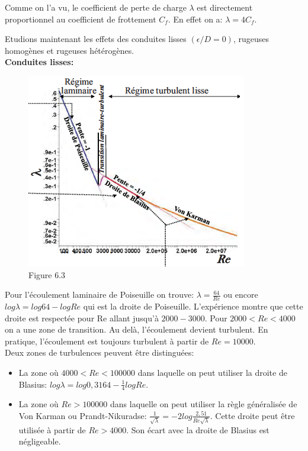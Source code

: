 Comme on l'a vu, le coefficient de perte de charge $\lambda$ est directement proportionnel au coefficient de frottement $C_f$. En effet on a: $\lambda=4C_f$.

Etudions maintenant les effets des conduites lisses $(\epsilon/D=0)$, rugeuses homogènes et rugeuses hétérogènes.
\\

\textbf{Conduites lisses:} \\
\begin{figure}
\vspace{-5mm}
\includegraphics[scale=0.50]{ch6/64.png}
\caption*{Figure 6.3}
\end{figure}
Pour l'écoulement laminaire de Poiseuille on trouve: $\lambda=\frac{64}{Re}$ ou encore $log\lambda=log64-logRe$ qui est la droite de Poiseuille. L'expérience montre que cette droite est respectée pour Re allant jusqu'à $2000-3000$. Pour $2000<Re<4000$ on a une zone de transition. Au delà, l'écoulement devient turbulent. En pratique, l'écoulement est toujours turbulent à partir de $Re=10000$.
\\
Deux zones de turbulences peuvent être distinguées:
\begin{itemize}
\item La zone où $4000<Re<100000$ dans laquelle on peut utiliser la droite de Blasius: $log\lambda=log0,3164-\frac{1}{4}logRe$.
\item La zone où $Re>100000$ dans laquelle on peut utiliser la règle généralisée de Von Karman ou Prandt-Nikuradse: $\frac{1}{\sqrt{\lambda}}=-2log\frac{2,51}{Re\sqrt{\lambda}}$. Cette droite peut être utilisée à partir de $Re>4000$. Son écart avec la droite de Blasius est négligeable.\\
\end{itemize}

